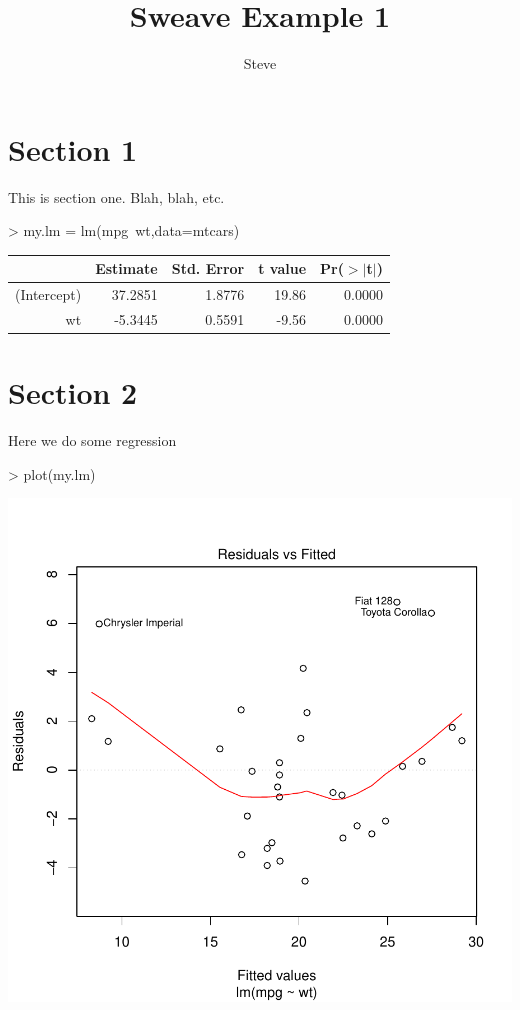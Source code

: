 \documentclass[a4paper]{article}
\title{Sweave Example 1}
\author{Steve}
\begin{document}

\maketitle
\section{Section 1}
This is section one. Blah, blah, etc.
\begin{Schunk}
\begin{Sinput}
> my.lm = lm(mpg~wt,data=mtcars)
\end{Sinput}
\end{Schunk}

\begin{table}[ht]
\centering
\begin{tabular}{rrrrr}
  \hline
 & Estimate & Std. Error & t value & Pr($>$$|$t$|$) \\ 
  \hline
(Intercept) & 37.2851 & 1.8776 & 19.86 & 0.0000 \\ 
  wt & -5.3445 & 0.5591 & -9.56 & 0.0000 \\ 
   \hline
\end{tabular}
\end{table} 

\section{Section 2}
Here we do some regression
\begin{Schunk}
\begin{Sinput}
> plot(my.lm)
\end{Sinput}
\end{Schunk}
\includegraphics{examp15-002}
\end{document}
